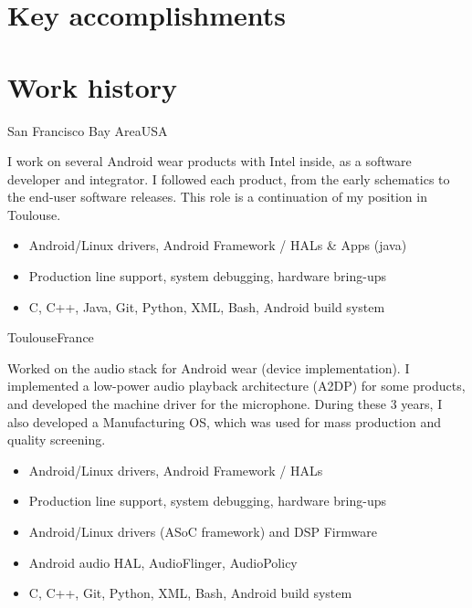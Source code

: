 \documentclass[a4paper,11pt,sans]{moderncv}
\begin{document}
\section{Key accomplishments}
\begin{cvcolumns}
\end{cvcolumns}
\begin{cvcolumns}
\end{cvcolumns}


\section{Work history}
{San Francisco Bay Area}{USA}
{
  I work on several Android wear products with Intel inside, as a software developer and integrator.
  I followed each product, from the early schematics to the end-user software releases.
  This role is a continuation of my position in Toulouse.
    \begin{itemize}
        \item Android/Linux drivers, Android Framework / HALs \& Apps (java)
        \item Production line support, system debugging, hardware bring-ups
        \item C, C++, Java, Git, Python, XML, Bash, Android build system
    \end{itemize}
}

{Toulouse}{France}
{
  Worked on the audio stack for Android wear (device implementation). I implemented a low-power audio playback architecture (A2DP) for some products, and developed the machine driver for the microphone.
  During these 3 years, I also developed a Manufacturing OS, which was used for mass production and quality screening.
    \begin{itemize}
        \item Android/Linux drivers, Android Framework / HALs
        \item Production line support, system debugging, hardware bring-ups
        \item Android/Linux drivers (ASoC framework) and DSP Firmware
        \item Android audio HAL, AudioFlinger, AudioPolicy
        \item C, C++, Git, Python, XML, Bash, Android build system
    \end{itemize}
}
\end{document}
